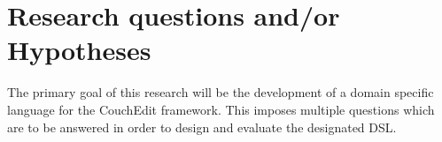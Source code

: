 \documentclass[10pt,a4paper,oneside]{scrartcl}
\newcommand\hint[2]{
\ifthenelse{\boolean{showhints}}{
\begin{center}
\colorbox{black!10}{
\begin{minipage}{.963\textwidth}
#2\hfill\textbf{#1}
\end{minipage}
}\end{center}}{}
}
\begin{document}
\section{Research questions and/or Hypotheses}
\label{sub:questions}






The primary goal of this research will be the development of a domain specific language for the CouchEdit framework. This imposes multiple questions which are to be answered in order to design and evaluate the designated DSL.
\end{document}
